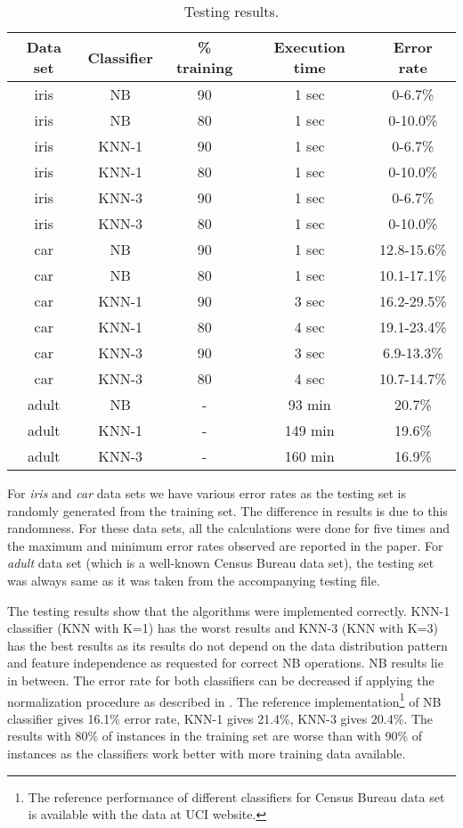 \documentclass{llncs}
\begin{document}
\begin{table}
\begin{center}
  \begin{tabular}{ | c | c | c | c | c |}
    \hline
    \textbf{Data set} & \textbf{Classifier} & \textbf{\% training} & \textbf{Execution time} & \textbf{Error rate}\\ \hline
    iris & NB & 90 & 1 sec & 0-6.7\% \\ \hline
    iris & NB & 80 & 1 sec & 0-10.0\% \\ \hline
    iris & KNN-1 & 90 & 1 sec & 0-6.7\% \\ \hline
    iris & KNN-1 & 80 & 1 sec & 0-10.0\% \\ \hline
    iris & KNN-3 & 90 & 1 sec & 0-6.7\% \\ \hline
    iris & KNN-3 & 80 & 1 sec & 0-10.0\% \\ \hline
    car & NB & 90 & 1 sec & 12.8-15.6\% \\ \hline
    car & NB & 80 & 1 sec & 10.1-17.1\% \\ \hline
    car & KNN-1 & 90 & 3 sec & 16.2-29.5\% \\ \hline
    car & KNN-1 & 80 & 4 sec & 19.1-23.4\% \\ \hline
    car & KNN-3 & 90 & 3 sec & 6.9-13.3\% \\ \hline
    car & KNN-3 & 80 & 4 sec & 10.7-14.7\% \\ \hline
	adult & NB & - & 93 min & 20.7\% \\ \hline
	adult & KNN-1 & - & 149 min & 19.6\% \\ \hline
    adult & KNN-3 & - & 160 min & 16.9\% \\
    \hline
  \end{tabular}
  \caption{Testing results.}
\end{center}
\end{table}

For \emph{iris} and \emph{car} data sets we have various error rates as the testing set is randomly generated from the training set. The difference in results is due to this randomness. For these data sets, all the calculations were done for five times and the maximum and minimum error rates observed are reported in the paper. For \emph{adult} data set (which is a well-known Census Bureau data set), the testing set was always same as it was taken from the accompanying testing file.

The testing results show that the algorithms were implemented correctly. KNN-1 classifier (KNN with K=1) has the worst results and KNN-3 (KNN with K=3) has the best results as its results do not depend on the data distribution pattern and feature independence as requested for correct NB operations. NB results lie in between. The error rate for both classifiers can be decreased if applying the normalization procedure as described in \cite{Suarez}. The reference implementation\footnote{The reference performance of different classifiers for Census Bureau data set is available with the data at UCI website.} of NB classifier gives 16.1\% error rate, KNN-1 gives 21.4\%, KNN-3 gives 20.4\%. The results with 80\% of instances in the training set are worse than with 90\% of instances as the classifiers work better with more training data available.
\end{document}
